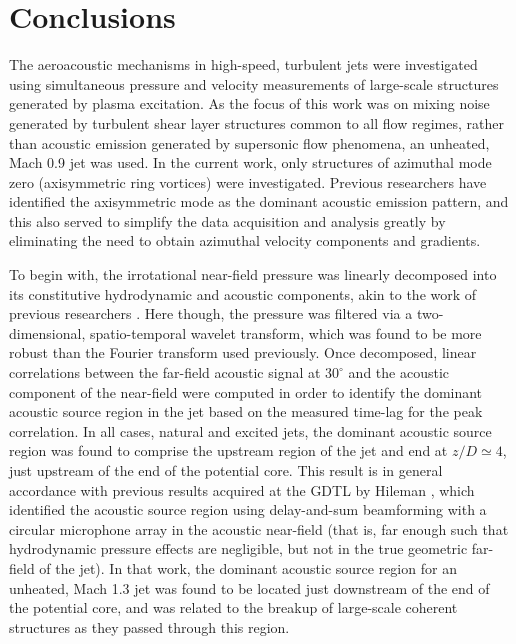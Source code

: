\chapter{Conclusions}
The aeroacoustic mechanisms in high-speed, turbulent jets were investigated using simultaneous pressure and velocity measurements of large-scale structures generated by plasma excitation.
As the focus of this work was on mixing noise generated by turbulent shear layer structures common to all flow regimes, rather than acoustic emission generated by supersonic flow phenomena, an unheated, Mach 0.9 jet was used.
In the current work, only structures of azimuthal mode zero (axisymmetric ring vortices) were investigated. Previous researchers have identified the axisymmetric mode as the dominant acoustic emission pattern, and this also served to simplify the data acquisition and analysis greatly by eliminating the need to obtain azimuthal velocity components and gradients.

To begin with, the irrotational near-field pressure was linearly decomposed into its constitutive hydrodynamic and acoustic components, akin to the work of previous researchers \citep{Tinney2008}.
Here though, the pressure was filtered via a two-dimensional, spatio-temporal wavelet transform, which was found to be more robust than the Fourier transform used previously.
Once decomposed, linear correlations between the far-field acoustic signal at $30^\circ$ and the acoustic component of the near-field were computed in order to identify the dominant acoustic source region in the jet based on the measured time-lag for the peak correlation.
In all cases, natural and excited jets, the dominant acoustic source region was found to comprise the upstream region of the jet and end at $z/D \simeq 4$, just upstream of the end of the potential core.
This result is in general accordance with previous results acquired at the GDTL by Hileman \etal \citep{Hileman2005}, which identified the acoustic source region using delay-and-sum beamforming with a circular microphone array in the acoustic near-field (that is, far enough such that hydrodynamic pressure effects are negligible, but not in the true geometric far-field of the jet).
In that work, the dominant acoustic source region for an unheated, Mach 1.3 jet was found to be located just downstream of the end of the potential core, and was related to the breakup of large-scale coherent structures as they passed through this region.

